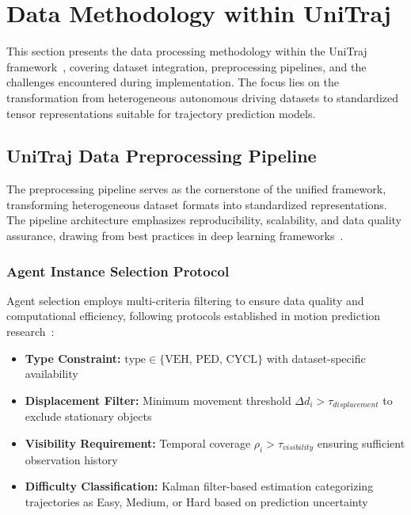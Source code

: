 

\section{Data Methodology within UniTraj}
This section presents the data processing methodology within the UniTraj framework~\cite{unitrajFeng2024}, covering dataset integration, preprocessing pipelines, and the challenges encountered during implementation. The focus lies on the transformation from heterogeneous autonomous driving datasets to standardized tensor representations suitable for trajectory prediction models.

\subsection{UniTraj Data Preprocessing Pipeline}
\label{sec:data_pipeline}

The preprocessing pipeline serves as the cornerstone of the unified framework, transforming heterogeneous dataset formats into standardized representations. The pipeline architecture emphasizes reproducibility, scalability, and data quality assurance, drawing from best practices in deep learning frameworks~\cite{vaswani2023attention}.

\subsubsection{Agent Instance Selection Protocol}
\label{ssec:agent_selection}

Agent selection employs multi-criteria filtering to ensure data quality and computational efficiency, following protocols established in motion prediction research~\cite{WOMD2021, Chai2019MultiPath}:

\begin{itemize}
    \item \textbf{Type Constraint:} $\text{type} \in \{\text{VEH, PED, CYCL}\}$ with dataset-specific availability
    \item \textbf{Displacement Filter:} Minimum movement threshold $\Delta d_{i} > \tau_{displacement}$ to exclude stationary objects
    \item \textbf{Visibility Requirement:} Temporal coverage $\rho_{i} > \tau_{visibility}$ ensuring sufficient observation history
    \item \textbf{Difficulty Classification:} Kalman filter-based estimation categorizing trajectories as Easy, Medium, or Hard based on prediction uncertainty~\cite{MultiPathPlusPlus2022}
\end{itemize}

